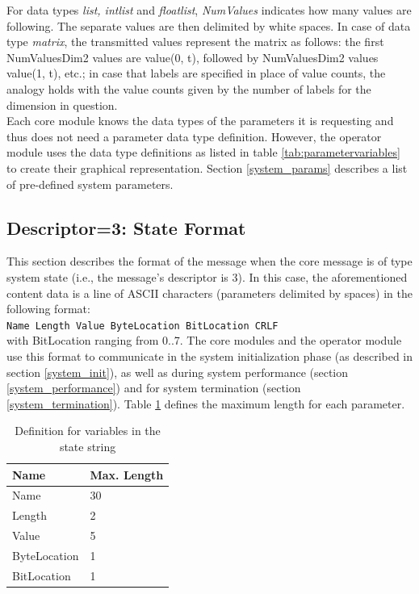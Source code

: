 \documentclass[letterpaper,oneside,12pt]{book}
\newcommand{\todo}[1]{}
\begin{document}
For data types \textit{list, intlist} and \textit{floatlist}, \textit{NumValues} 
indicates how many values are following. The separate values are then 
delimited by white spaces. In case of data type \textit{matrix}, the transmitted 
values represent the matrix as follows: the first NumValuesDim2 values are 
value(0, t), followed by NumValuesDim2 values value(1, t), etc.; in case that 
labels are specified in place of value counts, the analogy holds with the value 
counts given by the number of labels for the dimension in question.\\

Each core module knows the data types of the parameters it is requesting and 
thus does not need a parameter data type definition. However, the operator 
module uses the data type definitions as listed in table 
\ref{tab:parametervariables} to create their graphical representation. Section 
\ref{system_params} describes a list of pre-defined system parameters.

\todo{Describe proposal for parameter data type for state definition, e.g.,
TargetCode 1 Feedback 1}

\subsection{Descriptor=3: State Format}
\label{state_format}

This section describes the format of the message when the core message is of 
type system state (i.e., the message's descriptor is 3). In this case, the 
aforementioned content data is a line of ASCII characters (parameters
delimited by spaces) in the following format:
\\[2ex]
\verb|Name Length Value ByteLocation BitLocation CRLF|
\\[2ex]
with BitLocation ranging from 0..7.
The core modules and the operator module use this format to communicate in 
the system initialization phase (as described in section \ref{system_init}), 
as well as during system performance (section \ref{system_performance}) and 
for system termination (section \ref{system_termination}). Table 
\ref{state_table} defines the maximum length for each parameter.

\begin{table}[ht]
 \centering
 \begin{tabular}{|l|l|}
  \hline
  \textbf{Name} & \textbf{Max. Length} \\
  \hline
  Name & 30 \\
  \hline
  Length & 2 \\
  \hline
  Value & 5 \\
  \hline
  ByteLocation & 1 \\
  \hline
  BitLocation & 1 \\
  \hline
 \end{tabular}
 \caption{Definition for variables in the state string}
 \label{state_table}
\end{table}   
\end{document}
